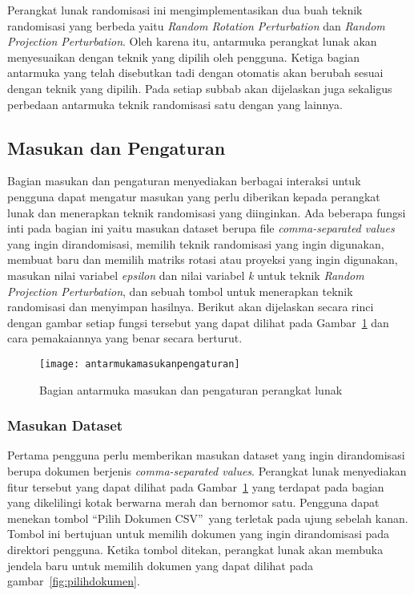 Perangkat lunak randomisasi ini mengimplementasikan dua buah teknik randomisasi yang berbeda yaitu \textit{Random Rotation Perturbation} dan \textit{Random Projection Perturbation}. Oleh karena itu, antarmuka perangkat lunak akan menyesuaikan dengan teknik yang dipilih oleh pengguna. Ketiga bagian antarmuka yang telah disebutkan tadi dengan otomatis akan berubah sesuai dengan teknik yang dipilih. Pada setiap subbab akan dijelaskan juga sekaligus perbedaan antarmuka teknik randomisasi satu dengan yang lainnya.

\subsection{Masukan dan Pengaturan}
\label{sec:masukanpengaturan}

Bagian masukan dan pengaturan menyediakan berbagai interaksi untuk pengguna dapat mengatur masukan yang perlu diberikan kepada perangkat lunak dan menerapkan teknik randomisasi yang diinginkan. Ada beberapa fungsi inti pada bagian ini yaitu masukan dataset berupa file \textit{comma-separated values} yang ingin dirandomisasi, memilih teknik randomisasi yang ingin digunakan, membuat baru dan memilih matriks rotasi atau proyeksi yang ingin digunakan, masukan nilai variabel \textit{epsilon} dan nilai variabel \textit{k} untuk teknik \textit{Random Projection Perturbation}, dan sebuah tombol untuk menerapkan teknik randomisasi dan menyimpan hasilnya. Berikut akan dijelaskan secara rinci dengan gambar setiap fungsi tersebut yang dapat dilihat pada Gambar~\ref{fig:antarmukamasukanpengaturan} dan cara pemakaiannya yang benar secara berturut. 

\begin{figure}
	\centering
	\texttt{[image: antarmukamasukanpengaturan]}
	\caption{Bagian antarmuka masukan dan pengaturan perangkat lunak}
	\label{fig:antarmukamasukanpengaturan}
\end{figure}

\subsubsection{Masukan Dataset}
\label{sec:masukandataset}

Pertama pengguna perlu memberikan masukan dataset yang ingin dirandomisasi berupa dokumen berjenis \textit{comma-separated values}. Perangkat lunak menyediakan fitur tersebut yang dapat dilihat pada Gambar~\ref{fig:antarmukamasukanpengaturan} yang terdapat pada bagian yang dikelilingi kotak berwarna merah dan bernomor satu. Pengguna dapat menekan tombol \textquotedblleft Pilih Dokumen CSV\textquotedblright~yang terletak pada ujung sebelah kanan. Tombol ini bertujuan untuk memilih dokumen yang ingin dirandomisasi pada direktori pengguna. Ketika tombol ditekan, perangkat lunak akan membuka jendela baru untuk memilih dokumen yang dapat dilihat pada gambar~\ref{fig:pilihdokumen}.

